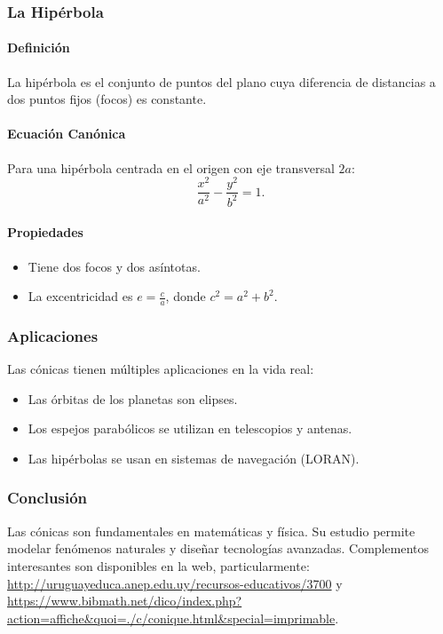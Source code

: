 \documentclass[11pt]{book}
\theoremstyle{definicion}
\theoremstyle{teorema}
\theoremstyle{ejemplo}
\begin{document}
\subsubsection{La Hipérbola}
\paragraph{Definición}
La hipérbola es el conjunto de puntos del plano cuya diferencia de distancias a dos puntos fijos (focos) es constante.

\paragraph{Ecuación Canónica}
Para una hipérbola centrada en el origen con eje transversal \( 2a \):
\[
\frac{x^2}{a^2} - \frac{y^2}{b^2} = 1.
\]

\paragraph{Propiedades}
\begin{itemize}
    \item Tiene dos focos y dos asíntotas.
    \item La excentricidad es \( e = \frac{c}{a} \), donde \( c^2 = a^2 + b^2 \).
\end{itemize}

\subsubsection{Aplicaciones}
Las cónicas tienen múltiples aplicaciones en la vida real:
\begin{itemize}
    \item Las órbitas de los planetas son elipses.
    \item Los espejos parabólicos se utilizan en telescopios y antenas.
    \item Las hipérbolas se usan en sistemas de navegación (LORAN).
\end{itemize}

\subsubsection{Conclusión}
Las cónicas son fundamentales en matemáticas y física. Su estudio permite modelar fenómenos naturales y diseñar tecnologías avanzadas.
Complementos interesantes son disponibles en la web, particularmente:
\url{http://uruguayeduca.anep.edu.uy/recursos-educativos/3700} y
\url{https://www.bibmath.net/dico/index.php?action=affiche&quoi=./c/conique.html&special=imprimable}.
\end{document}
